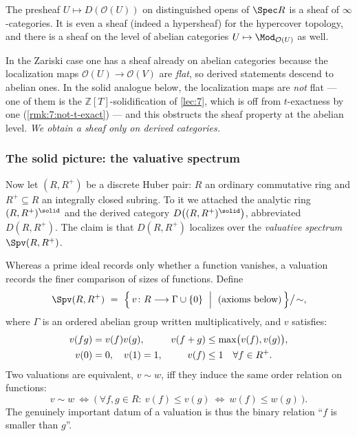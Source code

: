 \begin{theorem}
\label{thm:9:zariski-sheaf}
The presheaf $U\mapsto D(\mathcal O(U))$ on distinguished opens of $\Spec R$ is a
sheaf of $\infty$-categories. It is even a sheaf (indeed a hypersheaf) for the
hypercover topology, and there is a sheaf on the level of abelian categories
$U\mapsto\Mod_{\mathcal O(U)}$ as well.
\end{theorem}

\begin{remark}
\label{rmk:9:no-abelian-sheaf}
In the Zariski case one has a sheaf already on abelian categories because the
localization maps $\mathcal O(U)\to\mathcal O(V)$ are \emph{flat}, so derived
statements descend to abelian ones. In the solid analogue below, the
localization maps are \emph{not} flat --- one of them is the
$\mathbb{Z}[T]$-solidification of \cref{lec:7}, which is off from $t$-exactness
by one (\cref{rmk:7:not-t-exact}) --- and this obstructs the sheaf property at
the abelian level. \emph{We obtain a sheaf only on derived categories.}
\end{remark}

\subsubsection*{The solid picture: the valuative spectrum}

Now let $(R,R^{+})$ be a discrete Huber pair: $R$ an ordinary commutative ring
and $R^{+}\subseteq R$ an integrally closed subring. To it we attached the
analytic ring $(R,R^{+})^{\solid}$ and the derived category $D\bigl((R,R^{+})^{
\solid}\bigr)$, abbreviated $D(R,R^{+})$. The claim is that $D(R,R^{+})$
localizes over the \emph{valuative spectrum} $\Spv(R,R^{+})$.

\begin{definition}
\label{def:9:valuative-spectrum}
Whereas a prime ideal records only whether a function vanishes, a valuation
records the finer comparison of sizes of functions. Define
\begin{equation*}
\Spv(R,R^{+})\ =\ \Bigl\{\, v\colon R\longrightarrow\Gamma\cup\{0\}\ \Bigm|\
(\text{axioms below})\,\Bigr\}\big/\!\sim,
\end{equation*}
where $\Gamma$ is an ordered abelian group written multiplicatively, and $v$
satisfies:
\begin{align}
\label{eq:9:valuation-axioms}
v(fg)&=v(f)v(g), & v(f+g)&\le\max\bigl(v(f),v(g)\bigr), \notag\\
v(0)&=0,\quad v(1)=1, & v(f)&\le 1\quad\forall f\in R^{+}.
\end{align}
Two valuations are equivalent, $v\sim w$, iff they induce the same order
relation on functions:
\begin{equation*}
v\sim w\ \iff\ \bigl(\ \forall f,g\in R:\ v(f)\le v(g)\ \Longleftrightarrow\
w(f)\le w(g)\ \bigr).
\end{equation*}
The genuinely important datum of a valuation is thus the binary relation
``$f$ is smaller than $g$''.
\end{definition}

